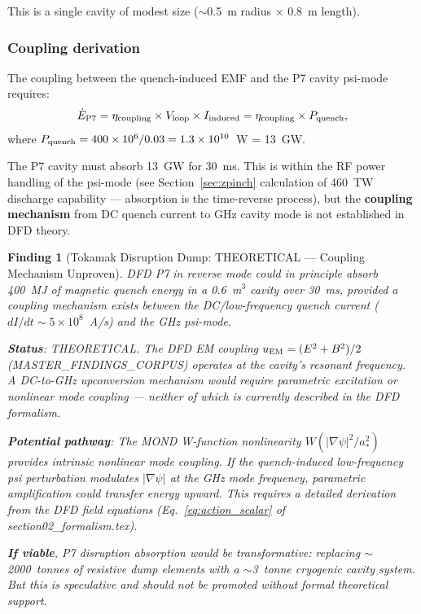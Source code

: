 \documentclass[11pt]{article}
\newtheorem{finding}{Finding}
\newcommand{\ee}[1]{\times 10^{#1}}
\begin{document}
This is a single cavity of modest size ($\sim$0.5~m radius $\times$
0.8~m length).

\subsubsection{Coupling derivation}

The coupling between the quench-induced EMF and the P7 cavity psi-mode
requires:
\begin{equation}
\dot{E}_{\rm P7} = \eta_{\rm coupling} \times V_{\rm loop} \times I_{\rm induced}
= \eta_{\rm coupling} \times P_{\rm quench},
\end{equation}
where $P_{\rm quench} = 400\ee{6}/0.03 = 1.3\ee{10}$~W = 13~GW.

The P7 cavity must absorb 13~GW for 30~ms. This is within the
RF power handling of the psi-mode (see Section~\ref{sec:zpinch}
calculation of 460~TW discharge capability --- absorption is the
time-reverse process), but the \textbf{coupling mechanism} from
DC quench current to GHz cavity mode is not established in DFD
theory.

\begin{finding}[Tokamak Disruption Dump: THEORETICAL --- Coupling Mechanism Unproven]
\label{find:disruption}
DFD P7 in reverse mode could in principle absorb 400~MJ of
magnetic quench energy in a 0.6~m$^3$ cavity over 30~ms, provided
a coupling mechanism exists between the DC/low-frequency quench
current ($dI/dt \sim 5\ee{8}$~A/s) and the GHz psi-mode.

\textbf{Status}: THEORETICAL. The DFD EM coupling
$u_{\rm EM} = (E^2 + B^2)/2$ (MASTER\_FINDINGS\_CORPUS) operates
at the cavity's resonant frequency. A DC-to-GHz upconversion
mechanism would require parametric excitation or nonlinear
mode coupling --- neither of which is currently described in the
DFD formalism.

\textbf{Potential pathway}: The MOND W-function nonlinearity
$W(|\nabla\psi|^2/a_*^2)$ provides intrinsic nonlinear mode
coupling. If the quench-induced low-frequency psi perturbation
modulates $|\nabla\psi|$ at the GHz mode frequency, parametric
amplification could transfer energy upward. This requires a
detailed derivation from the DFD field equations
(Eq.~\eqref{eq:action_scalar} of section02\_formalism.tex).

\textbf{If viable}, P7 disruption absorption would be
transformative: replacing $\sim$2000~tonnes of resistive dump
elements with a $\sim$3~tonne cryogenic cavity system. But
this is speculative and should not be promoted without formal
theoretical support.
\end{finding}
\end{document}
